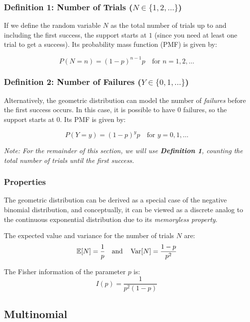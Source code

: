\subsubsection{Definition 1: Number of Trials ($N \in \{1, 2, \dots\}$)}
If we define the random variable $N$ as the total number of trials up to and including the first success, the support starts at $1$ (since you need at least one trial to get a success). Its probability mass function (PMF) is given by:

\begin{equation}
	P(N = n) = (1-p)^{n-1}p \quad \text{for } n = 1, 2, \dots
	\label{pmf:geom1}
\end{equation}

\subsubsection{Definition 2: Number of Failures ($Y \in \{0, 1, \dots\}$)}
Alternatively, the geometric distribution can model the number of \emph{failures} before the first success occurs. In this case, it is possible to have $0$ failures, so the support starts at $0$. Its PMF is given by:

\begin{equation}
	P(Y = y) = (1-p)^y p \quad \text{for } y = 0, 1, \dots
	\label{pmf:geom2}
\end{equation}

\begin{center}
	\textit{Note: For the remainder of this section, we will use \textbf{Definition 1}, counting the total number of trials until the first success.}
\end{center}

\subsubsection{Properties}
The geometric distribution can be derived as a special case of the negative binomial distribution, and conceptually, it can be viewed as a discrete analog to the continuous exponential distribution due to its \emph{memoryless property}.

The expected value and variance for the number of trials $N$ are:
	\[
	\mathbb{E}[N] = \frac{1}{p} \quad \text{and} \quad \operatorname{Var}[N] = \frac{1-p}{p^2}
	\]

The Fisher information of the parameter $p$ is:
	\[
	I(p) = \frac{1}{p^2(1-p)}
	\]

\clearpage
\subsection{Multinomial}

